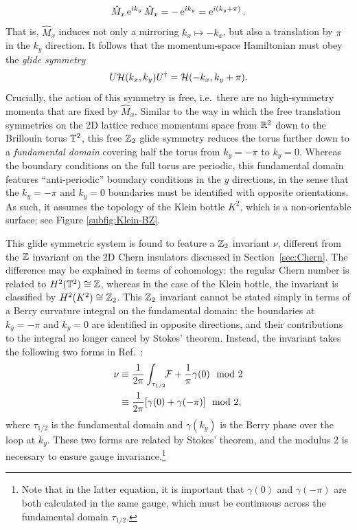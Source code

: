 \begin{equation*}
	\hat{M}_x\operatorname{e}^{ik_y}\hat{M}_x = -\operatorname{e}^{ik_y} = \operatorname{e}^{i(k_y+\pi)}.
\end{equation*}
That is, $\hat{M}_x$ induces not only a mirroring $k_x\mapsto-k_x$, but also a translation by $\pi$ in the $k_y$ direction. It follows that the momentum-space Hamiltonian must obey the \emph{glide symmetry}
\begin{equation}\label{eq:2D_glide}
	U\mathcal{H}(k_x, k_y)U^\dag = \mathcal{H}(-k_x, k_y + \pi).
\end{equation}
Crucially, the action of this symmetry is free, i.e.\ there are no high-symmetry momenta that are fixed by $\hat{M}_x$. Similar to the way in which the free translation symmetries on the 2D lattice reduce momentum space from $\mathbb{R}^2$ down to the Brillouin torus $\mathbb{T}^2$, this free $\mathbb{Z}_2$ glide symmetry reduces the torus further down to a \emph{fundamental domain} covering half the torus from $k_y=-\pi$ to $k_y=0$. Whereas the boundary conditions on the full torus are periodic, this fundamental domain features ``anti-periodic'' boundary conditions in the $y$ directions, in the sense that the $k_y=-\pi$ and $k_y=0$ boundaries must be identified with opposite orientations. As such, it assumes the topology of the Klein bottle $K^2$, which is a non-orientable surface; see Figure \ref{subfig:Klein-BZ}.

This glide symmetric system is found to feature a $\mathbb{Z}_2$ invariant $\nu$, different from the $\mathbb{Z}$ invariant on the 2D Chern insulators discussed in Section~\ref{sec:Chern}. The difference may be explained in terms of cohomology: the regular Chern number is related to $H^2(\mathbb{T}^2)\cong\mathbb{Z}$, whereas in the case of the Klein bottle, the invariant is classified by $H^2(K^2)\cong\mathbb{Z}_2$. This $\mathbb{Z}_2$ invariant cannot be stated simply in terms of a Berry curvature integral on the fundamental domain: the boundaries at $k_y=-\pi$ and $k_y=0$ are identified in opposite directions, and their contributions to the integral no longer cancel by Stokes' theorem. Instead, the invariant takes the following two forms in Ref.~\cite{CYZ_Klein-gauge}:
\begin{align}
	\nu &\equiv \frac{1}{2\pi}\int_{\tau_{1/2}}\!\!\mathcal{F} + \frac{1}{\pi}\gamma(0) \mod 2 \label{eq:z2-inv1} \\
		&\equiv \frac{1}{2\pi}[\gamma(0) + \gamma(-\pi)]\mod 2, \label{eq:z2-inv2}
\end{align}
where $\tau_{1/2}$ is the fundamental domain and $\gamma(k_y)$ is the Berry phase over the loop at $k_y$. These two forms are related by Stokes' theorem, and the modulus 2 is necessary to ensure gauge invariance.\footnote{
	Note that in the latter equation, it is important that $\gamma(0)$ and $\gamma(-\pi)$ are both calculated in the same gauge, which must be continuous across the fundamental domain $\tau_{1/2}$.}

